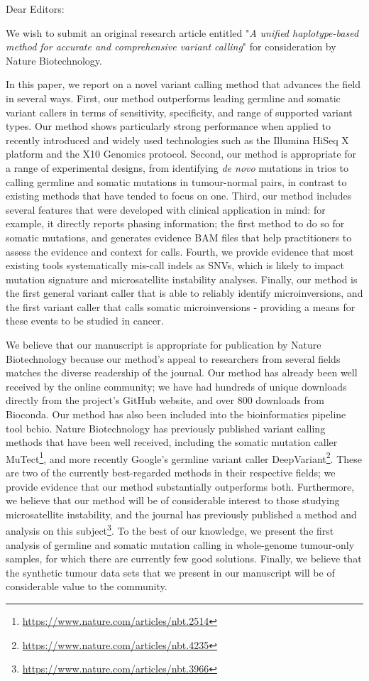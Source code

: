 \documentclass[10pt]{letter}
\begin{document}
\begin{letter}{}
\opening{Dear Editors:}

We wish to submit an original research article entitled "\emph{A unified haplotype-based method for accurate and comprehensive variant calling}" for consideration by Nature Biotechnology.

In this paper, we report on a novel variant calling method that advances the field in several ways. 
First, our method outperforms leading germline and somatic variant callers in terms of sensitivity, specificity, and range of supported variant types. Our method shows particularly strong performance when applied to recently introduced and widely used technologies such as the Illumina HiSeq X platform and the X10 Genomics protocol. 
Second, our method is appropriate for a range of experimental designs, from identifying \textit{de novo} mutations in trios to calling germline and somatic mutations in tumour-normal pairs, in contrast to existing methods that have tended to focus on one.
Third, our method includes several features that were developed with clinical application in mind: for example, it directly reports phasing information; the first method to do so for somatic mutations, and generates evidence BAM files that help practitioners to assess the evidence and context for calls. 
Fourth, we provide evidence that most existing tools systematically mis-call indels as SNVs, which is likely to impact mutation signature and microsatellite instability analyses.
Finally, our method is the first general variant caller that is able to reliably identify microinversions, and the first variant caller that calls somatic microinversions - providing a means for these events to be studied in cancer.

We believe that our manuscript is appropriate for publication by Nature Biotechnology because our method's appeal to researchers from several fields matches the diverse readership of the journal. 
Our method has already been well received by the online community; we have had hundreds of unique downloads directly from the project's GitHub website, and over 800 downloads from Bioconda. Our method has also been included into the bioinformatics pipeline tool bcbio.
Nature Biotechnology has previously published variant calling methods that have been well received, including the somatic mutation caller MuTect\footnote{\url{https://www.nature.com/articles/nbt.2514}}, and more recently Google's germline variant caller DeepVariant\footnote{\url{https://www.nature.com/articles/nbt.4235}}. These are two of the currently best-regarded methods in their respective fields; we provide evidence that our method substantially outperforms both. 
Furthermore, we believe that our method will be of considerable interest to those studying microsatellite instability, and the journal has previously published a method and analysis on this subject\footnote{\url{https://www.nature.com/articles/nbt.3966}}.
To the best of our knowledge, we present the first analysis of germline and somatic mutation calling in whole-genome tumour-only samples, for which there are currently few good solutions.
Finally, we believe that the synthetic tumour data sets that we present in our manuscript will be of considerable value to the community.


\end{letter}
\end{document}
